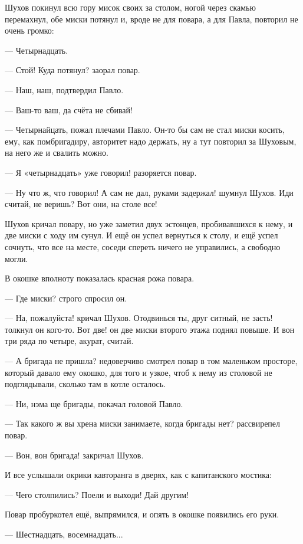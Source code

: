 Шухов покинул всю гору мисок своих за столом, ногой через скамью перемахнул, обе миски
потянул и, вроде не для повара, а для Павла, повторил не очень громко:

--- Четырнадцать.

--- Стой! Куда потянул? \dash заорал повар.

--- Наш, наш, \dash подтвердил Павло.

--- Ваш-то ваш, да счёта не сбивай!

--- Четырнайцать, \dash пожал плечами Павло. Он-то бы сам не стал миски косить, ему, как
помбригадиру, авторитет надо держать, ну а тут повторил за Шуховым, на него же и свалить
можно.

--- Я «четырнадцать» уже говорил! \dash разоряется повар.

--- Ну что ж, что говорил! А сам не дал, руками задержал! \dash шумнул Шухов. \Dash Иди считай, не веришь?
Вот они, на столе все!

Шухов кричал повару, но уже заметил двух эстонцев, пробивавшихся к нему, и две миски с ходу им
сунул. И ещё он успел вернуться к столу, и ещё успел сочнуть, что все на месте, соседи спереть
ничего не управились, а свободно могли.

В окошке вполноту показалась красная рожа повара.

--- Где миски? \dash строго спросил он.

--- На, пожалуйста! \dash кричал Шухов. \Dash Отодвинься ты, друг ситный, не засть! \dash толкнул он
кого-то. \Dash Вот две! \dash он две миски второго этажа поднял повыше. \Dash И вон три ряда по четыре,
акурат, считай.

--- А бригада не пришла? \dash недоверчиво смотрел повар в том маленьком просторе, который давало
ему окошко, для того и узкое, чтоб к нему из столовой не подглядывали, сколько там в котле
осталось.

--- Ни, нэма ще бригады, \dash покачал головой Павло.

--- Так какого ж вы хрена миски занимаете, когда бригады нет? \dash рассвирепел повар.

--- Вон, вон бригада! \dash закричал Шухов.

И все услышали окрики кавторанга в дверях, как с капитанского мостика:

--- Чего столпились? Поели \dash и выходи! Дай другим!

Повар пробуркотел ещё, выпрямился, и опять в окошке появились его руки.

--- Шестнадцать, восемнадцать...

